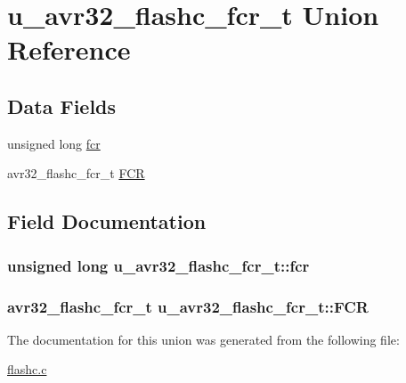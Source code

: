 \hypertarget{unionu__avr32__flashc__fcr__t}{
\section{u\-\_\-avr32\-\_\-flashc\-\_\-fcr\-\_\-t \-Union \-Reference}
\label{unionu__avr32__flashc__fcr__t}
}
\subsection*{\-Data \-Fields}
\begin{DoxyCompactItemize}
\item 
unsigned long \hyperlink{unionu__avr32__flashc__fcr__t_a4931f45cdf8856a36fd6670033cfbe99}{fcr}
\item 
avr32\-\_\-flashc\-\_\-fcr\-\_\-t \hyperlink{unionu__avr32__flashc__fcr__t_aa8f3a48553db579f2272c10a5ad2c710}{\-F\-C\-R}
\end{DoxyCompactItemize}


\subsection{\-Field \-Documentation}
\hypertarget{unionu__avr32__flashc__fcr__t_a4931f45cdf8856a36fd6670033cfbe99}{
\subsubsection[{fcr}]{\setlength{\rightskip}{0pt plus 5cm}unsigned long {\bf u\-\_\-avr32\-\_\-flashc\-\_\-fcr\-\_\-t\-::fcr}}}
\label{unionu__avr32__flashc__fcr__t_a4931f45cdf8856a36fd6670033cfbe99}
\hypertarget{unionu__avr32__flashc__fcr__t_aa8f3a48553db579f2272c10a5ad2c710}{
\subsubsection[{\-F\-C\-R}]{\setlength{\rightskip}{0pt plus 5cm}avr32\-\_\-flashc\-\_\-fcr\-\_\-t {\bf u\-\_\-avr32\-\_\-flashc\-\_\-fcr\-\_\-t\-::\-F\-C\-R}}}
\label{unionu__avr32__flashc__fcr__t_aa8f3a48553db579f2272c10a5ad2c710}


\-The documentation for this union was generated from the following file\-:\begin{DoxyCompactItemize}
\item 
\hyperlink{flashc_8c}{flashc.\-c}\end{DoxyCompactItemize}
